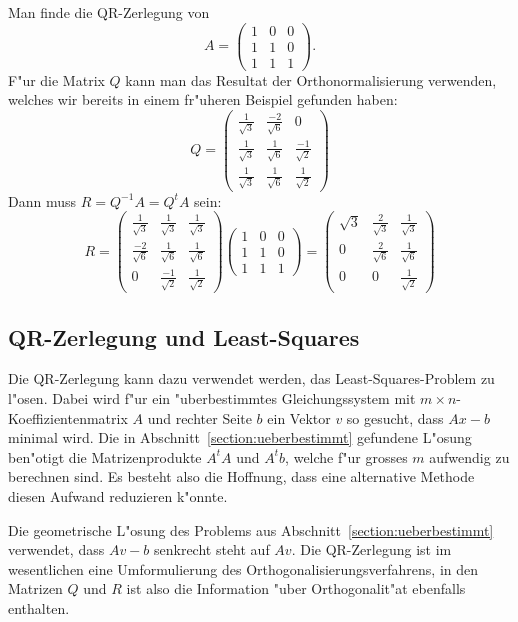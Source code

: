 \begin{beispiel}
Man finde die QR-Zerlegung von 
\[
A=\begin{pmatrix}1&0&0\\1&1&0\\1&1&1\end{pmatrix}.
\]
F"ur die Matrix $Q$ kann man das Resultat der Orthonormalisierung
verwenden, welches wir bereits in einem fr"uheren Beispiel gefunden
haben:
\[
Q=
\begin{pmatrix}
\frac1{\sqrt{3}}&\frac{-2}{\sqrt{6}}&0\\
\frac1{\sqrt{3}}&\frac{1}{\sqrt{6}}&\frac{-1}{\sqrt{2}}\\
\frac1{\sqrt{3}}&\frac{1}{\sqrt{6}}&\frac{1}{\sqrt{2}}
\end{pmatrix}
\]
Dann muss $R=Q^{-1}A=Q^tA$ sein:
\[
R=
\begin{pmatrix}
\frac1{\sqrt{3}}&\frac1{\sqrt{3}}&\frac1{\sqrt{3}}\\
\frac{-2}{\sqrt{6}}&\frac{1}{\sqrt{6}}&\frac{1}{\sqrt{6}}\\
0&\frac{-1}{\sqrt{2}}&\frac{1}{\sqrt{2}}
\end{pmatrix}
\begin{pmatrix}1&0&0\\1&1&0\\1&1&1\end{pmatrix}
=
\begin{pmatrix}
\sqrt{3}&\frac{2}{\sqrt{3}}&\frac{1}{\sqrt{3}}\\
0&\frac2{\sqrt{6}}&\frac1{\sqrt{6}}\\
0&0&\frac1{\sqrt{2}}
\end{pmatrix}
\]
\end{beispiel}

\subsection{QR-Zerlegung und Least-Squares}
Die QR-Zerlegung kann dazu verwendet werden, das Least-Squares-Problem
zu l"osen. Dabei wird f"ur ein "uberbestimmtes Gleichungssystem mit
$m\times n$-Koeffizienten\-matrix $A$ und rechter Seite $b$ ein Vektor $v$
so gesucht,
dass $Ax-b$ minimal wird. Die in Abschnitt~\ref{section:ueberbestimmt}
gefundene L"osung ben"otigt die Matrizenprodukte $A^tA$ und $A^tb$, welche
f"ur grosses $m$ aufwendig zu berechnen sind. Es besteht also die Hoffnung,
dass eine alternative Methode diesen Aufwand reduzieren k"onnte.

Die geometrische L"osung des Problems aus Abschnitt~\ref{section:ueberbestimmt}
verwendet, dass $Av-b$ senkrecht steht auf $Av$. Die QR-Zerlegung ist
im wesentlichen eine Umformulierung des Orthogonalisierungsverfahrens, in den
Matrizen $Q$ und $R$ ist also die Information "uber Orthogonalit"at ebenfalls
enthalten.

